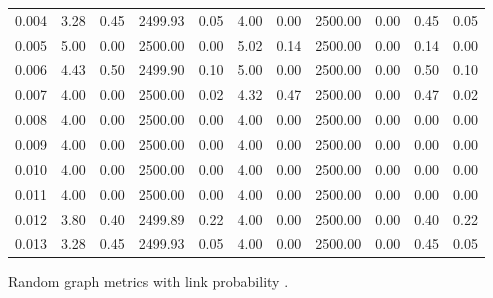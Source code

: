 \documentclass{article}
\begin{document}
\begin{figure}[h]
\begin{center}
\begin{tabular}{|r|rr|rr|rr|rr|rr|}
0.004 & 3.28 & 0.45 & 2499.93 & 0.05 & 4.00 & 0.00 & 2500.00 & 0.00 & 0.45 & 0.05\\
0.005 & 5.00 & 0.00 & 2500.00 & 0.00 & 5.02 & 0.14 & 2500.00 & 0.00 & 0.14 & 0.00\\
0.006 & 4.43 & 0.50 & 2499.90 & 0.10 & 5.00 & 0.00 & 2500.00 & 0.00 & 0.50 & 0.10\\
0.007 & 4.00 & 0.00 & 2500.00 & 0.02 & 4.32 & 0.47 & 2500.00 & 0.00 & 0.47 & 0.02\\
0.008 & 4.00 & 0.00 & 2500.00 & 0.00 & 4.00 & 0.00 & 2500.00 & 0.00 & 0.00 & 0.00\\
0.009 & 4.00 & 0.00 & 2500.00 & 0.00 & 4.00 & 0.00 & 2500.00 & 0.00 & 0.00 & 0.00\\
0.010 & 4.00 & 0.00 & 2500.00 & 0.00 & 4.00 & 0.00 & 2500.00 & 0.00 & 0.00 & 0.00\\
0.011 & 4.00 & 0.00 & 2500.00 & 0.00 & 4.00 & 0.00 & 2500.00 & 0.00 & 0.00 & 0.00\\
0.012 & 3.80 & 0.40 & 2499.89 & 0.22 & 4.00 & 0.00 & 2500.00 & 0.00 & 0.40 & 0.22\\
0.013 & 3.28 & 0.45 & 2499.93 & 0.05 & 4.00 & 0.00 & 2500.00 & 0.00 & 0.45 & 0.05\\
\hline
\end{tabular}
\caption{Random graph metrics with link probability .}
\label{exp_random}
\end{center}
\end{figure}
\end{document}
